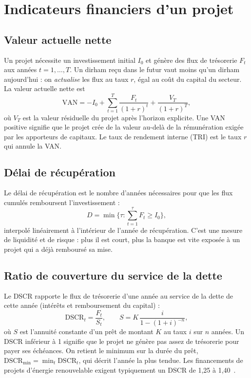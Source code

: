 \section{Indicateurs financiers d'un projet}\label{sec:indicateurs}

\subsection{Valeur actuelle nette}

Un projet nécessite un investissement initial $I_0$ et génère des flux de trésorerie $F_t$ aux années
$t = 1, \dots, T$. Un dirham reçu dans le futur vaut moins qu'un dirham aujourd'hui : on \emph{actualise} les flux au
taux $r$, égal au coût du capital du secteur. La valeur actuelle nette est
\begin{equation}
  \mathrm{VAN} = -I_0 + \sum_{t=1}^{T} \frac{F_t}{(1+r)^t} + \frac{V_T}{(1+r)^T},
\end{equation}
où $V_T$ est la valeur résiduelle du projet après l'horizon explicite. Une VAN positive signifie que le projet crée
de la valeur au-delà de la rémunération exigée par les apporteurs de capitaux. Le taux de rendement interne (TRI) est
le taux $r$ qui annule la VAN.

\subsection{Délai de récupération}

Le délai de récupération est le nombre d'années nécessaires pour que les flux cumulés remboursent
l'investissement :
\begin{equation}
  D = \min \Big\{ \tau : \sum_{t=1}^{\tau} F_t \geq I_0 \Big\},
\end{equation}
interpolé linéairement à l'intérieur de l'année de récupération. C'est une mesure de liquidité et de risque : plus
il est court, plus la banque est vite exposée à un projet qui a déjà remboursé sa mise.

\subsection{Ratio de couverture du service de la dette}

Le DSCR rapporte le flux de trésorerie d'une année au service de la dette de cette année (intérêts et
remboursement du capital) :
\begin{equation}
  \mathrm{DSCR}_t = \frac{F_t}{S_t}, \qquad S = K\,\frac{i}{1-(1+i)^{-n}},
\end{equation}
où $S$ est l'annuité constante d'un prêt de montant $K$ au taux $i$ sur $n$ années. Un DSCR inférieur à 1 signifie
que le projet ne génère pas assez de trésorerie pour payer ses échéances. On retient le minimum sur la durée du
prêt, $\mathrm{DSCR}_{\min} = \min_t \mathrm{DSCR}_t$, qui décrit l'année la plus tendue. Les financements de
projets d'énergie renouvelable exigent typiquement un DSCR de 1,25 à 1,40~\cite{nrel2024}.

